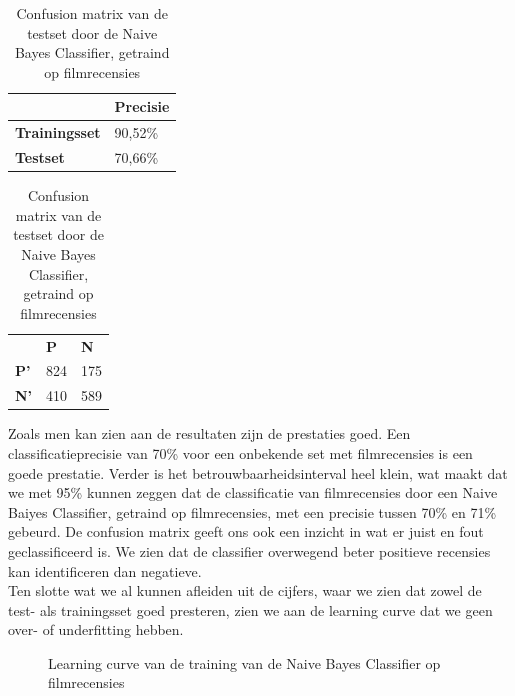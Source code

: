 \begin{table}[h]
\centering
\setlength\tabcolsep{4pt}
\begin{minipage}{0.48\textwidth}
\centering
\begin{tabular}{l|l|}
\cline{2-2}
                                            & \textbf{Precisie} \\ \hline
\multicolumn{1}{|l|}{\textbf{Trainingsset}} & 90,52\%           \\ \hline
\multicolumn{1}{|l|}{\textbf{Testset}}      & 70,66\%           \\ \hline
\end{tabular}
\caption{Classificatieprecisie Naive Bayes Classifier, getraind op filmrecensies}
\label{tab:movie-movie}
\end{minipage}%
\hfill
\begin{minipage}{0.48\textwidth}
\centering
\begin{tabular}{lll}
                                 & \textbf{P}               & \textbf{N}               \\ \cline{2-3} 
\multicolumn{1}{l|}{\textbf{P'}} & \multicolumn{1}{l|}{824} & \multicolumn{1}{l|}{175} \\ \cline{2-3} 
\multicolumn{1}{l|}{\textbf{N'}} & \multicolumn{1}{l|}{410} & \multicolumn{1}{l|}{589} \\ \cline{2-3} 
\end{tabular}
\caption{Confusion matrix van de testset door de  Naive Bayes Classifier, getraind op filmrecensies} 
\label{tab:cm-movie-movie} 
\end{minipage}
\end{table}

Zoals men kan zien aan de resultaten zijn de prestaties goed. Een classificatieprecisie van 70\% voor een onbekende set met filmrecensies is een goede prestatie. Verder is het betrouwbaarheidsinterval heel klein, wat maakt dat we met 95\% kunnen zeggen dat de classificatie van filmrecensies door een Naive Baiyes Classifier, getraind op filmrecensies, met een precisie tussen 70\% en 71\% gebeurd. De confusion matrix geeft ons  ook een inzicht in wat er juist en fout geclassificeerd is. We zien dat de classifier overwegend beter positieve recensies kan identificeren dan negatieve.\\
%
Ten slotte wat we al kunnen afleiden uit de cijfers, waar we zien dat zowel de test- als trainingsset goed presteren, zien we aan de learning curve dat we geen over- of underfitting hebben. 

\begin{figure}[h]%
    \centering
    \label{fig:lc-movie-movie}
    \caption{Learning curve van de training van de Naive Bayes Classifier op filmrecensies}
\end{figure}

